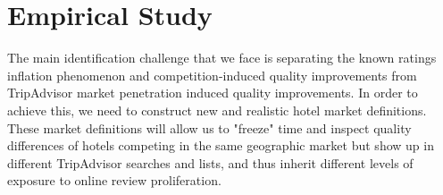 \documentclass[mksc,blindrev]{informs3} %
\begin{document}

\section*{Empirical Study}\label{sec:maineffect} 

The main identification challenge that we face is separating the known ratings inflation phenomenon and competition-induced quality improvements from TripAdvisor market penetration induced quality improvements. In order to achieve this, we need to construct new and realistic hotel market definitions. These market definitions will allow us to "freeze" time and inspect quality differences of hotels competing in the same geographic market but show up in different TripAdvisor searches and lists, and thus inherit different levels of exposure to online review proliferation.


\end{document}
